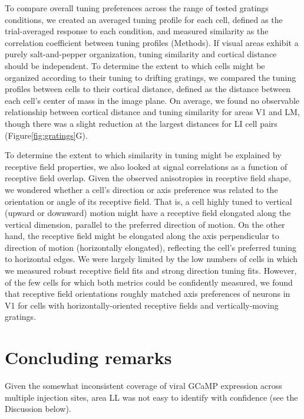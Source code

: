 To compare overall tuning preferences across the range of tested gratings conditions, we created an averaged tuning profile for each cell, defined as the trial-averaged response to each condition, and measured similarity as the correlation coefficient between tuning profiles (Methods). If visual areas exhibit a purely salt-and-pepper organization, tuning similarity and cortical distance should be independent. To determine the extent to which cells might be organized according to their tuning to drifting gratings, we compared the tuning profiles between cells to their cortical distance, defined as the distance between each cell’s center of mass in the image plane. On average, we found no observable relationship between cortical distance and tuning similarity for areas V1 and LM, though there was a slight reduction at the largest distances for LI cell pairs (Figure\ref{fig:gratings}G). 

To determine the extent to which similarity in tuning might be explained by receptive field properties, we also looked at signal correlations as a function of receptive field overlap. Given the observed anisotropies in receptive field shape, we wondered whether a cell's direction or axis preference was related to the orientation or angle of its receptive field. That is, a cell highly tuned to vertical (upward or downward) motion might have a receptive field elongated along the vertical dimension, parallel to the preferred direction of motion. On the other hand, the receptive field might be elongated along the axis perpendicular to direction of motion (horizontally elongated), reflecting the cell's preferred tuning to horizontal edges. We were largely limited by the low numbers of cells in which we measured robust receptive field fits and strong direction tuning fits. However, of the few cells for which both metrics could be confidently measured, we found that receptive field orientations roughly matched axis preferences of neurons in V1 for cells with horizontally-oriented receptive fields and vertically-moving gratings. 



\section{Concluding remarks}

Given the somewhat inconsistent coverage of viral GCaMP expression across multiple injection sites, area LL was not easy to identify with confidence (see the Discussion below).
